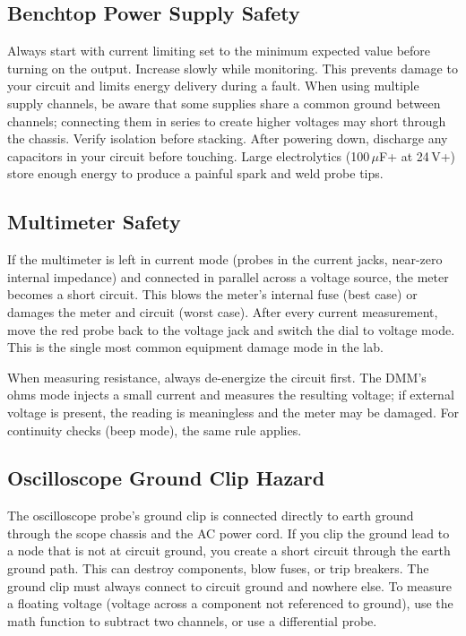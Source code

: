 \documentclass[11pt,letterpaper,twoside,openany]{book}
\begin{document}
\subsection{Benchtop Power Supply Safety}
Always start with current limiting set to the minimum expected value before turning on the output. Increase slowly while monitoring. This prevents damage to your circuit and limits energy delivery during a fault. When using multiple supply channels, be aware that some supplies share a common ground between channels; connecting them in series to create higher voltages may short through the chassis. Verify isolation before stacking. After powering down, discharge any capacitors in your circuit before touching. Large electrolytics (100\,$\mu$F+ at 24\,V+) store enough energy to produce a painful spark and weld probe tips.

\subsection{Multimeter Safety}

\begin{warningbox}
If the multimeter is left in current mode (probes in the current jacks, near-zero internal impedance) and connected in parallel across a voltage source, the meter becomes a short circuit. This blows the meter's internal fuse (best case) or damages the meter and circuit (worst case). After every current measurement, move the red probe back to the voltage jack and switch the dial to voltage mode. This is the single most common equipment damage mode in the lab.
\end{warningbox}

When measuring resistance, always de-energize the circuit first. The DMM's ohms mode injects a small current and measures the resulting voltage; if external voltage is present, the reading is meaningless and the meter may be damaged. For continuity checks (beep mode), the same rule applies.

\subsection{Oscilloscope Ground Clip Hazard}
The oscilloscope probe's ground clip is connected directly to earth ground through the scope chassis and the AC power cord. If you clip the ground lead to a node that is not at circuit ground, you create a short circuit through the earth ground path. This can destroy components, blow fuses, or trip breakers. The ground clip must always connect to circuit ground and nowhere else. To measure a floating voltage (voltage across a component not referenced to ground), use the math function to subtract two channels, or use a differential probe.
\end{document}
